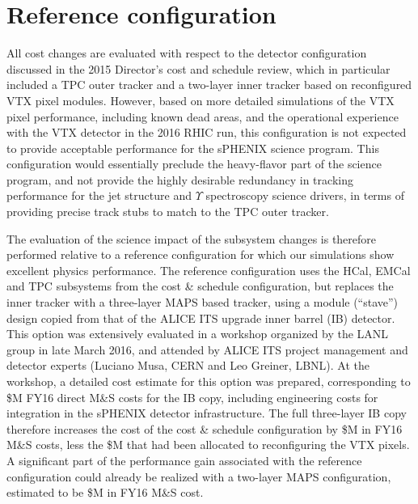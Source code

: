 \section{Reference configuration}

All cost changes are evaluated with respect to the detector
configuration discussed in the 2015 Director's cost and schedule
review, which in particular included a TPC outer tracker and a
two-layer inner tracker based on reconfigured VTX pixel
modules. However, based on more detailed simulations of the VTX pixel
performance, including known dead areas, and the operational
experience with the VTX detector in the 2016 RHIC run, this
configuration is not expected to provide acceptable performance for
the sPHENIX science program. This configuration would essentially
preclude the heavy-flavor part of the science program, and not provide
the highly desirable redundancy in tracking performance for the jet
structure and $\Upsilon$ spectroscopy science drivers, in terms of
providing precise track stubs to match to the TPC outer tracker.

The evaluation of the science impact of the subsystem changes is
therefore performed relative to a reference configuration for which
our simulations show excellent physics performance. The reference
configuration uses the HCal, EMCal and TPC subsystems from the cost \&
schedule configuration, but replaces the inner tracker with
a three-layer MAPS based tracker, using a module (``stave'') design
copied from that of the ALICE ITS upgrade inner barrel (IB)
detector. This option was extensively evaluated in a workshop
organized by the LANL group in late March 2016, and attended by ALICE ITS
project management and detector experts (Luciano Musa, CERN and  Leo Greiner, LBNL).  At
the workshop, a detailed cost estimate for this option was prepared,
corresponding to \${\threeLayerMAPS}M FY16 direct M\&S costs for the
IB copy, including engineering costs for integration in the sPHENIX
detector infrastructure.  The full three-layer IB copy therefore
increases the cost of the cost \& schedule configuration by
\${\threeLayerMAPS}M in FY16 M\&S costs, less the \${\noVTX}M that had
been allocated to reconfiguring the VTX pixels. A significant part of
the performance gain associated with the reference configuration could
already be realized with a two-layer MAPS configuration, estimated to be
\${\twoLayerMAPS}M in FY16 M\&S cost.

